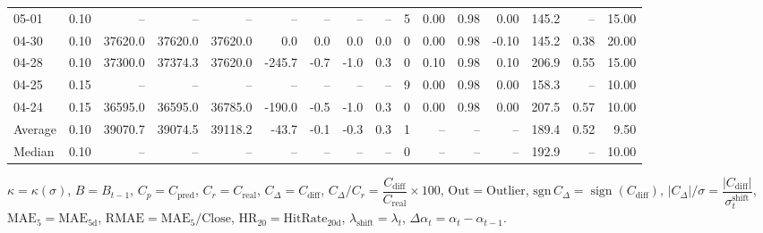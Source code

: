 \begin{threeparttable}
{\begin{tabular}{lrrrrrrrrrrrrrrr}
  05-01 &     0.10 &      -- &      -- &      -- &         -- &             -- &                       -- &                  -- &              5 &       0.00 &      0.98 &           0.00 &            145.2 &              -- &                  15.00 \\
  04-30 &     0.10 & 37620.0 & 37620.0 & 37620.0 &        0.0 &            0.0 &                      0.0 &                 0.0 &              0 &       0.00 &      0.98 &          -0.10 &            145.2 &            0.38 &                  20.00 \\
  04-28 &     0.10 & 37300.0 & 37374.3 & 37620.0 &     -245.7 &           -0.7 &                     -1.0 &                 0.3 &              0 &       0.10 &      0.98 &           0.10 &            206.9 &            0.55 &                  15.00 \\
  04-25 &     0.15 &      -- &      -- &      -- &         -- &             -- &                       -- &                  -- &              9 &       0.00 &      0.98 &           0.00 &            158.3 &              -- &                  10.00 \\
  04-24 &     0.15 & 36595.0 & 36595.0 & 36785.0 &     -190.0 &           -0.5 &                     -1.0 &                 0.3 &              0 &       0.00 &      0.98 &           0.00 &            207.5 &            0.57 &                  10.00 \\
Average &     0.10 & 39070.7 & 39074.5 & 39118.2 &      -43.7 &           -0.1 &                     -0.3 &                 0.3 &              1 &         -- &        -- &             -- &            189.4 &            0.52 &                   9.50 \\
 Median &     0.10 &      -- &      -- &      -- &         -- &             -- &                       -- &                  -- &              0 &         -- &        -- &             -- &            192.9 &              -- &                  10.00 \\
\bottomrule
\end{tabular}
}
\begin{tablenotes}\footnotesize
\item $\kappa=\kappa(\sigma)$, $B=B_{t-1}$, $C_p=C_{\text{pred}}$, $C_r=C_{\text{real}}$, $C_\Delta=C_{\text{diff}}$, $C_\Delta/C_r=\dfrac{C_{\text{diff}}}{C_{\text{real}}}\times100$, $\mathrm{Out}=\text{Outlier}$, $\mathrm{sgn}\,C_\Delta=\operatorname{sign}(C_{\text{diff}})$, $|C_\Delta|/\sigma=\dfrac{|C_{\text{diff}}|}{\sigma_t^{\text{shift}}}$, $\mathrm{MAE}_5=\mathrm{MAE}_{5\text{d}}$, $\mathrm{RMAE}= \mathrm{MAE}_5 / \text{Close}$, $\mathrm{HR}_{20}=\mathrm{HitRate}_{20\text{d}}$, 
$\lambda_{\text{shift}}=\lambda_t$, 
$\Delta\alpha_t=\alpha_t-\alpha_{t-1}$.
\end{tablenotes}
\end{threeparttable}
\endgroup

